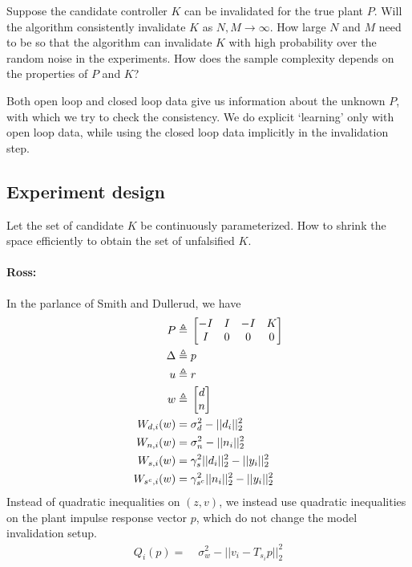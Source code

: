 \documentclass[11pt, onecolumn]{article}
\newcommand{\rb}[1]{{\color{red}{Ross: #1}}}
\begin{document}
Suppose the candidate controller $K$ can be invalidated for the true plant $P$.   Will
the algorithm consistently invalidate $K$ as $N,M\to\infty$.  How large $N$ and $M$ need to be so that the
algorithm can invalidate $K$ with high probability over the random noise in the experiments. How
does the sample complexity depends on the properties of $P$ and $K$?

Both open loop and closed loop data give us information about the unknown $P$, with which we try to
check the consistency.  We do explicit `learning' only with open loop data, while using the closed
loop data implicitly in the invalidation step.


\subsection{Experiment design}

Let the set of candidate $K$ be continuously parameterized. How to shrink the space efficiently to
obtain the set of unfalsified $K$.





\paragraph{Ross:}


\rb{I forget which covariance constraint things we came up with}
In the parlance of Smith and Dullerud, we have
\begin{align*}
P \triangleq &\; \begin{bmatrix}-I & I & -I & K\\I & 0 & 0 & 0\end{bmatrix}\\
\Delta \triangleq &\; p \\
u \triangleq &\; r \\
w \triangleq &\; \begin{bmatrix}d\\n\end{bmatrix}\\
W_{d,i}(w) = &\; \sigma_d^2 - ||d_i||_2^2\\
W_{n,i}(w) = &\; \sigma_n^2 - ||n_i||_2^2\\
W_{s,i}(w) = &\; \gamma_s^2||d_i||_2^2 - ||y_i||_2^2\\
W_{s^c,i}(w) = &\; \gamma_{s^c}^2||n_i||_2^2 - ||y_i||_2^2\\
\end{align*}
Instead of quadratic inequalities on $(z,v)$, we instead use quadratic inequalities on the plant impulse response vector $p$, which do not change the model invalidation setup.
\begin{align*}
Q_i(p) = &\; \sigma_w^2 - ||v_i - T_{s_i}p||_2^2
\end{align*}
\rb{Todo: quadratic equality constraints}
\end{document}
